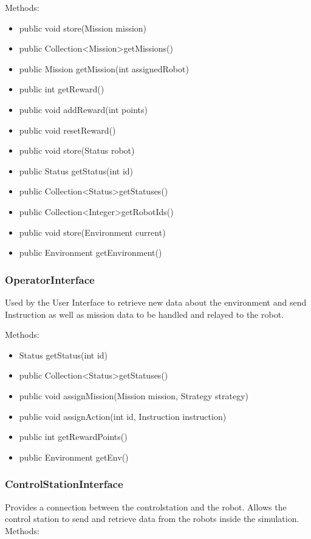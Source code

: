 Methods:
\begin{itemize}
    \item  public void store(Mission mission)
    \item  public Collection\textless Mission\textgreater getMissions()
    \item public Mission getMission(int assignedRobot)
    \item public int getReward()
    \item public void addReward(int points)
    \item public void resetReward()
    \item public void store(Status robot)
    \item public Status getStatus(int id)
    \item public Collection\textless Status\textgreater getStatuses()
    \item public Collection\textless Integer\textgreater getRobotIds()
    \item public void store(Environment current)
    \item public Environment getEnvironment()
\end{itemize}

\subsubsection{OperatorInterface}
Used by the User Interface to retrieve new data about the environment and send Instruction as well as mission data to be handled and relayed to the robot.

Methods:
\begin{itemize}
    \item Status getStatus(int id)
    \item public Collection\textless Status\textgreater getStatuses()
    \item public void assignMission(Mission mission, Strategy strategy)
    \item public void assignAction(int id, Instruction instruction)
    \item public int getRewardPoints() 
    \item public Environment getEnv()
\end{itemize}

\subsubsection{ControlStationInterface}
Provides a connection between the controlstation and the robot. Allows the control station to send and retrieve data from the robots inside the simulation.
Methods:

